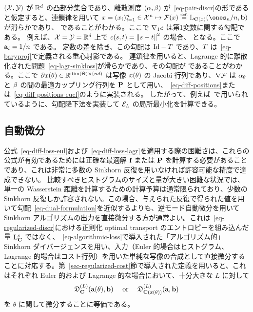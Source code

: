 $(\X,\Y)$ が $\RR^\dim$ の凸部分集合であり、離散測度 $(\al,\be)$ が~\eqref{eq-pair-discr}の形であると仮定すると、連鎖律を用いて $x = (x_i)_{i=1}^n  \in \X^n \mapsto \Ff(x) \eqdef  \MKD_{\C(x)}(\ones_n/n,\b)$ が滑らかであり、
であることがわかる。ここで $\nabla_1 \c$ は第1変数に関する勾配である。
例えば、$\X=\Y=\RR^d$ 上で $\c(s,t) = \norm{s-t}^2$ の場合、
となる。ここで $\a_i=1/n$ である。
定数の差を除き、この勾配は $\Id-\T$ であり、$\T$ は~\eqref{eq-baryproj}で定義される重心射影である。
連鎖律を用いると、Lagrange 的に離散化された問題~\eqref{eq-lagr-sinkloss}が滑らかであり、その勾配が
であることがわかる。ここで $\partial x(\th) \in \RR^{\text{dim}(\Theta) \times (n\dim)}$ は写像 $x(\th)$ の Jacobi 行列であり、$\nabla \Ff$ は $\al_\th$ と $\be$ の間の最適カップリング行列を $\P$ として用い、~\eqref{eq-diff-positions}または~\eqref{eq-diff-positions-eucl}のように実装される。
したがって、例えば~\citep{CuturiBarycenter}で用いられているように、勾配降下法を実装して $\Ee_L$ の局所最小化を計算できる。

\subsection{自動微分}
\label{rem-auto-diff}

公式~\eqref{eq-diff-loss-eul}および~\eqref{eq-diff-loss-lagr}を適用する際の困難さは、これらの公式が有効であるためには正確な最適解 $\fD$ または $\P$ を計算する必要があることであり、これは非常に多数の Sinkhorn 反復を用いなければ許容可能な精度で達成できない。
比較すべきヒストグラムのサイズと量が大きい困難な状況では、単一の Wasserstein 距離を計算するための計算予算は通常限られており、少数の Sinkhorn 反復しか許容されない。この場合、与えられた反復で得られた値を用いて勾配~\eqref{eq-dual-formulation}を近似するよりも、逆モード自動微分を用いて Sinkhorn アルゴリズムの出力を直接微分する方が通常よい。これは~\eqref{eq-regularized-discr}における正則化 optimal transport のエントロピーを組み込んだ量 $\MKD_\C^\varepsilon$ ではなく、~\eqref{eq-algorithmic-loss}で導入された「アルゴリズム的」Sinkhorn ダイバージェンスを用い、入力（Euler 的場合はヒストグラム、Lagrange 的場合はコスト行列）を用いた単純な写像の合成として直接微分することに対応する。第~\ref{sec-regularized-cost}節で導入された定義を用いると、これはそれぞれ Euler 的および Lagrange 的な場合において、十分大きな $L$ に対して
$$\itL{\SINKHORND_{\C}}(\a(\theta),\b) \quad\text{ or }\quad \itL{\SINKHORND_{\C(x(\theta))}}(\a,\b)$$
を $\theta$ に関して微分することに等価である。

